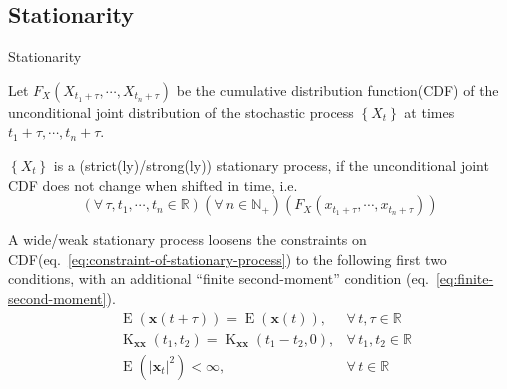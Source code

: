 \documentclass[utf-8, 10pt, aspectratio=1610]{beamer}
\begin{document}
\subsection{Stationarity}
\begin{frame}[allowframebreaks]{Stationarity}
	\vspace*{\fill}
	\begin{definition}
		\par Let \(F_X\left(X_{t_1+\tau},\cdots,X_{t_n+\tau}\right)\) be the cumulative distribution function(CDF) of the unconditional joint distribution of the stochastic process \(\left\{X_t\right\}\) at times \(t_1+\tau,\cdots,t_n+\tau\).
		\par \(\left\{X_t\right\}\) is a (strict(ly)/strong(ly)) stationary process, if the unconditional joint CDF does not change when shifted in time, i.e.
		\begin{equation}
			\left(\forall\, \tau,t_1,\cdots,t_n\in \mathbb{R}\right)\left(\forall\,n\in \mathbb{N}_{+}\right)\left(F_X\left(x_{t_1+\tau},\cdots,x_{t_n+\tau}\right)\right)
		\end{equation}\label{eq:constraint-of-stationary-process}
	\end{definition}
	\vspace*{\fill}

	\framebreak
	\vspace*{\fill}
	\begin{definition}
		A wide/weak stationary process loosens the constraints on CDF(eq.~\ref{eq:constraint-of-stationary-process}) to the following first two conditions, with an additional ``finite second-moment'' condition (eq.~\ref{eq:finite-second-moment}).
		\begin{align}
			 & \operatorname{E}\left(\mathbf{x}(t+\tau)\right) = \operatorname{E}\left(\mathbf{x}(t)\right),                                  & \forall\, t,\tau \in \mathbb{R}                            \\
			 & \operatorname{K}_{\mathbf{x}\mathbf{x}}\left(t_1, t_2\right) = \operatorname{K}_{\mathbf{x}\mathbf{x}}\left(t_1-t_2, 0\right), & \forall\, t_1,t_2 \in \mathbb{R}                           \\
			 & \operatorname{E}\left(\vert \mathbf{x}_t \vert^2 \right) < \infty,                                                             & \forall\, t \in \mathbb{R} \label{eq:finite-second-moment}
		\end{align}
	\end{definition}
	\vspace*{\fill}


\end{frame}
\end{document}
